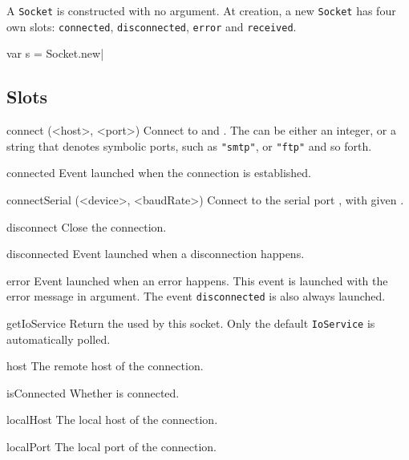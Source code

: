 A \lstinline|Socket| is constructed with no argument. At creation, a
new \lstinline|Socket| has four own slots: \lstinline|connected|,
\lstinline|disconnected|, \lstinline|error| and \lstinline|received|.

\begin{urbiscript}
var s = Socket.new|
\end{urbiscript}

\subsection{Slots}
\begin{urbiscriptapi}

\item[connect](<host>, <port>)%
  Connect \this to  and .  The
   can be either an integer, or a string that denotes
  symbolic ports, such as \lstinline|"smtp"|, or \lstinline|"ftp"| and
  so forth.

\item[connected]
  Event launched when the connection is established.

\item[connectSerial](<device>, <baudRate>)%
  Connect \this to the serial port , with given
  .

\item[disconnect]
  Close the connection.

\item[disconnected]
  Event launched when a disconnection happens.

\item[error]
  Event launched when an error happens. This event is launched with
  the error message in argument. The event \lstinline|disconnected| is
  also always launched.

\item[getIoService]
  Return the  used by this socket. Only the default
  \lstinline|IoService| is automatically polled.

\item[host]
  The remote host of the connection.

\item[isConnected]
  Whether \this is connected.

\item[localHost]
  The local host of the connection.

\item[localPort]
  The local port of the connection.


\end{urbiscriptapi}
